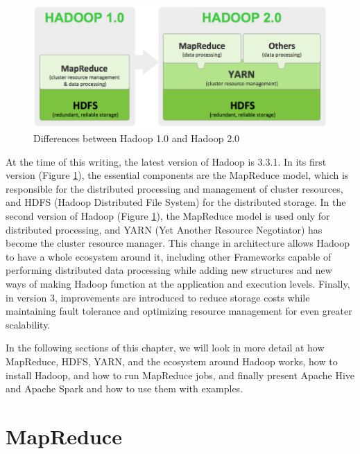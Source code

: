 \documentclass[12pt,english]{book}
\begin{document}
\begin{figure}[ht]
\centering
\includegraphics[width=\linewidth]{hadoop1vshadoop2}
\caption[Differences between Hadoop 1.0 and Hadoop 2.0]{Differences between Hadoop 1.0 and Hadoop 2.0 \footnotemark}
\label{fig:differenceBetweenHadoop1and2}
\end{figure}

At the time of this writing, the latest version of Hadoop is 3.3.1.
In its first version (Figure \ref{fig:differenceBetweenHadoop1and2}), the essential components are the MapReduce model, which is responsible for the distributed processing and management of cluster resources, and HDFS (Hadoop Distributed File System) for the distributed storage.
In the second version of Hadoop (Figure \ref{fig:differenceBetweenHadoop1and2}), the MapReduce model is used only for distributed processing, and YARN (Yet Another Resource Negotiator) has become the cluster resource manager.
This change in architecture allows Hadoop to have a whole ecosystem around it, including other Frameworks capable of performing distributed data processing while adding new structures and new ways of making Hadoop function at the application and execution levels.
Finally, in version 3, improvements are introduced to reduce storage costs while maintaining fault tolerance and optimizing resource management for even greater scalability.

In the following sections of this chapter, we will look in more detail at how MapReduce, HDFS, YARN, and the ecosystem around Hadoop works, how to install Hadoop, and how to run MapReduce jobs, and finally present Apache Hive and Apache Spark and how to use them with examples.


\section{MapReduce}
\end{document}
